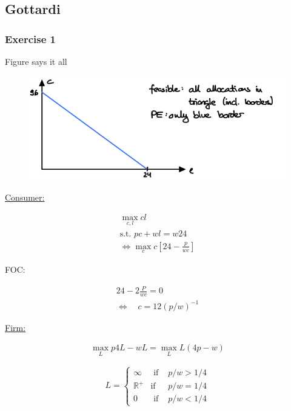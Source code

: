 {
\subsection*{Gottardi}

{
\subsubsection*{Exercise 1}

\begin{enumerate}[label=(\alph*)]
{\item Figure says it all 

\begin{figure}[!htp]
    \centering
    \includegraphics[width=.75\textwidth]{images/2017_18_1.png}
\end{figure}
}
{\item 
\underline{Consumer:}

\begin{align*}
    \max_{c,l} cl \\
    \text{s.t. } pc+w l=w 24 \\
    \Longleftrightarrow \max _{c} c\left[24-\frac{p}{w c}\right]
\end{align*}

FOC: 

\begin{align*}
    24-2 \frac{P}{w c}=0 \\
    \Leftrightarrow \quad c=12(p / w)^{-1}
\end{align*}

\underline{Firm:}

\begin{align*}
    \max_L p 4 L-w L=\max_L L\left(4p-w\right)
\end{align*}

$$
L=\left\{\begin{array}{lll}
\infty & \text { if } & p / w>1 / 4 \\
\mathbb{R}^{+} & \text {if } & p / w=1 / 4 \\
0 & \text { if } & p / w<1 / 4
\end{array}\right.
$$

}
\end{enumerate}}}
